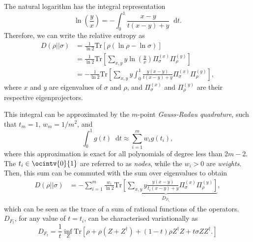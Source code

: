 \documentclass[10pt, a4paper]{article}
\numberwithin{equation}{section} %
\theoremstyle{definition}
\theoremstyle{plain}
\newcommand{\dif}{\mathop{}\!\mathrm{d}} %
\newcommand{\?}{\mathrel{?}} %
\newcommand{\Tr}{\mathrm{Tr}} %
\begin{document}
      The natural logarithm has the integral representation
      \begin{equation}
        \ln\left(\frac{y}{x}\right) = -\int_{0}^{1} \frac{x-y}{t(x-y) + y} \dif{t}.
      \end{equation}
      Therefore, we can write the relative entropy as
      \begin{align}
        D(\rho||\sigma) &= \frac{1}{\ln 2} \Tr\left[\rho \left(\ln\rho - \ln\sigma\right) \right] \\
                        &= \frac{1}{\ln 2} \Tr\left[ \sum_{x,y} y \ln\left(\frac{y}{x}\right) \Pi^{(x)}_{\sigma} \Pi^{(y)}_{\rho}  \right]\label{eqn:finitedim_relent} \\ 
                        &= -\frac{1}{\ln 2} \Tr\left[ \sum_{x,y} y \int_{0}^{1} \frac{y(x-y)}{t(x-y)+y} \Pi^{(x)}_{\sigma} \Pi^{(y)}_{\rho} \right],
      \end{align}
      where \(x\) and \(y\) are eigenvalues of \(\sigma\) and \(\rho\), and \(\Pi^{(x)}_{\sigma}\) and \(\Pi^{(y)}_{\rho}\) are their respective eigenprojectors.

      This integral can be approximated by the \(m\)-point \emph{Gauss-Radau quadrature}, such that \(t_m = 1\), \(w_m = 1/m^2\), and
      \begin{equation}
        \int_{0}^{1} g(t) \dif{t} \approx \sum_{i=1}^m w_i g(t_i),
      \end{equation}
      where this approximation is exact for all polynomials of degree less than \(2m-2\). The \(t_i \in \ocintv{0}{1}\) are referred to as \emph{nodes}, while the \(w_i > 0\) are \emph{weights}. Then, this sum can be commuted with the sum over eigenvalues to obtain
      \begin{align}
        D(\rho||\sigma) &= - \sum_{i=1}^{m} \frac{w_i}{\ln 2} \underbrace{\Tr\left[ \sum_{x,y} y \frac{y(x-y)}{t_i(x-y)+y} \Pi^{(x)}_{\sigma} \Pi^{(y)}_{\rho} \right]}_{D_{F_{t_i}}},
      \end{align}
      which can be seen as the trace of a sum of rational functions of the operators. \(D_{F_{t}}\), for any value of \(t=t_i\), can be characterised variationally as
      \begin{equation}
        D_{F_{t}} = \frac{1}{t} \inf_Z \Tr\left[ \rho + \rho(Z + Z^{\dagger}) + (1-t)\rho{}Z^{\dagger}Z + t\sigma{}ZZ^{\dagger}. \right]
      \end{equation}
\end{document}
